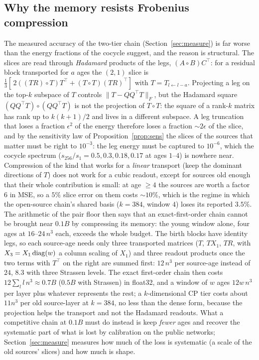 \subsection{Why the memory resists Frobenius compression}
The measured accuracy of the two-tier chain (Section~\ref{sec:measure}) is far worse than the energy fractions
of the cocycle suggest, and the reason is structural. The slices are read through \emph{Hadamard} products of the
legs, $(A\circ B)C^\top$: for a residual block transported for $a$ ages the $(2,1)$ slice is
$\tfrac13[\,2((TR)\circ T)T^\top+(T\circ T)(TR)^\top]$ with $T=T_{l\leftarrow l-a}$. Projecting a leg on the top-$k$
subspace of $T$ controls $\|T-QQ^\top T\|_F$, but the Hadamard square $(QQ^\top T)\circ(QQ^\top T)$ is not the
projection of $T\circ T$: the square of a rank-$k$ matrix has rank up to $k(k+1)/2$ and lives in a different
subspace. A leg truncation that loses a fraction $\epsilon^2$ of the energy therefore loses a fraction $\sim2\epsilon$
of the slice, and by the sensitivity law of Proposition~\ref{prop:sens} the slices of the sources that matter must
be right to $10^{-3}$: the leg energy must be captured to $10^{-6}$, which the cocycle spectrum ($s_{256}/s_1=0.5,
0.3,0.18,0.17$ at ages $1$--$4$) is nowhere near. Compression of the kind that works for a \emph{linear} transport
(keep the dominant directions of $T$) does not work for a cubic readout, except for sources old enough that
their whole contribution is small: at age $\ge4$ the sources are worth a factor $6$ in MSE, so a $5\%$ slice error
on them costs $\sim10\%$, which is the regime in which the open-source chain's shared basis ($k=384$, window $4$)
loses its reported $3.5\%$. The arithmetic of the pair floor then says that an exact-first-order chain cannot be
brought near $0.1B$ by compressing its memory: the young window alone, four ages at $16$--$24\,n^3$ each, exceeds
the whole budget. The birth blocks have identity legs, so each source-age needs only three transported matrices ($T$, $TX_1$, $TR$,
with $X_3=X_1\operatorname{diag}(w)$ a column scaling of $X_1$) and three readout products once the two terms with $T^\top$ on the
right are summed first: $12\,n^3$ per source-age instead of $24$, $8.3$ with three Strassen levels. The
exact first-order chain then costs $12\sum_{l}l\,n^3\approx0.7B$ ($0.5B$ with Strassen) in float32, and a window of
$w$ ages $12w\,n^3$ per layer plus whatever represents the rest; a $k$-dimensional CP tier costs about $11n^3$ per old
source-layer at $k=384$, no less than the dense form, because the projection helps the transport and not the
Hadamard readouts. What a competitive chain at $0.1B$ must do instead is keep \emph{fewer} ages and recover the
systematic part of what is lost by calibration on the public networks; Section~\ref{sec:measure} measures how
much of the loss is systematic (a scale of the old sources' slices) and how much is shape.
